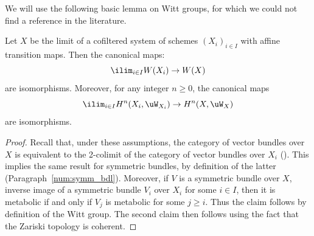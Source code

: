 We will use the following basic lemma on Witt groups,
for which we could not find a reference in the literature.
\begin{lm}\label{lm:Witt_lim}
Let $X$ be the limit of a cofiltered system of schemes $(X_i)_{i \in I}$ with affine transition maps. Then the canonical maps:
\[
\ilim_{i \in I} W(X_i) \to W(X)
\]
are isomorphisms.
Moreover, for any integer $n \geqslant 0$, the canonical maps
\begin{equation*}\label{eq:unramf_Witt_coh&lim}
\ilim_{i \in I} H^n(X_i,\uW_{X_i}) \to H^n(X,\uW_X)
\end{equation*}
are isomorphisms.
\end{lm}
\begin{proof}
Recall that, under these assumptions, the category of vector bundles over~$X$ is equivalent to the 2-colimit of the category of vector bundles over $X_i$ (\cite[8.5.3--8.5.5]{EGA4}).
This implies the same result for symmetric bundles, by definition of the latter (Paragraph~\ref{num:symm_bdl}).
Moreover, if $V$ is a symmetric bundle over $X$, inverse image of a symmetric bundle $V_i$ over $X_i$ for some $i\in I$, then it is metabolic if and only if $V_j$ is metabolic for some $j\ge i$.
Thus the claim follows by definition of the Witt group.
The second claim then follows using the fact that the Zariski topology is coherent.
\end{proof}

